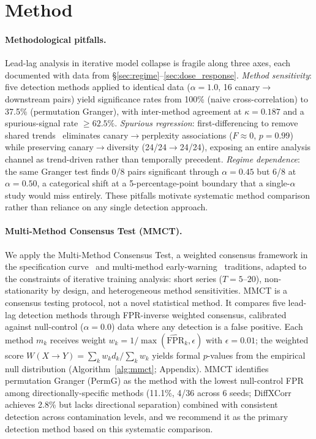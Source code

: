 \section{Method}
\label{sec:method}

\paragraph{Methodological pitfalls.}
\label{sec:pitfalls}
Lead-lag analysis in iterative model collapse is fragile along three axes, each documented with data from \S\ref{sec:regime}--\ref{sec:dose_response}.
\emph{Method sensitivity}: five detection methods applied to identical data ($\alpha{=}1.0$, 16 canary$\to$downstream pairs) yield significance rates from 100\% (naive cross-correlation) to 37.5\% (permutation Granger), with inter-method agreement at $\kappa{=}0.187$ and a spurious-signal rate ${\geq}62.5\%$.
\emph{Spurious regression}: first-differencing to remove shared trends~\cite{granger1974spurious} eliminates canary$\to$perplexity associations ($F{\approx}0$, $p{=}0.99$) while preserving canary$\to$diversity (24/24$\to$24/24), exposing an entire analysis channel as trend-driven rather than temporally precedent.
\emph{Regime dependence}: the same Granger test finds 0/8 pairs significant through $\alpha{=}0.45$ but 6/8 at $\alpha{=}0.50$, a categorical shift at a 5-percentage-point boundary that a single-$\alpha$ study would miss entirely.
These pitfalls motivate systematic method comparison rather than reliance on any single detection approach.

\paragraph{Multi-Method Consensus Test (MMCT).}
\label{sec:mmct}
We apply the Multi-Method Consensus Test, a weighted consensus framework in the specification curve~\cite{simonsohn2020specification} and multi-method early-warning~\cite{scheffer2009early,bell2022modeling} traditions, adapted to the constraints of iterative training analysis: short series ($T{=}5$--$20$), non-stationarity by design, and heterogeneous method sensitivities.
MMCT is a consensus testing protocol, not a novel statistical method.
It compares five lead-lag detection methods through FPR-inverse weighted consensus, calibrated against null-control ($\alpha{=}0.0$) data where any detection is a false positive.
Each method $m_k$ receives weight $w_k = 1/\max(\hat{\text{FPR}}_k, \epsilon)$ with $\epsilon{=}0.01$; the weighted score $W(X \to Y) = \sum_k w_k d_k / \sum_k w_k$ yields formal $p$-values from the empirical null distribution (Algorithm~\ref{alg:mmct}; Appendix).
MMCT identifies permutation Granger (PermG) as the method with the lowest null-control FPR among directionally-specific methods (11.1\%, 4/36 across 6 seeds; DiffXCorr achieves 2.8\% but lacks directional separation) combined with consistent detection across contamination levels, and we recommend it as the primary detection method based on this systematic comparison.

